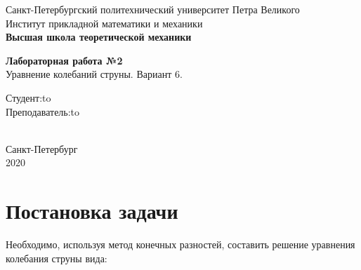 \documentclass[a4paper,fontsize=14pt]{article}
\begin{document}
	
	\begin{titlepage}
		\newpage
		
		\begin{center}
			Санкт-Петербургский политехнический университет Петра Великого \\
			Институт прикладной математики и механики \\
			\textbf{Высшая школа теоретической механики}
		\end{center}
		
		\vspace{10em}
		
		\begin{center}
			\Large{\textbf{Лабораторная работа №2}} \\
			Уравнение колебаний струны. Вариант 6. \\
		\end{center}
		
		\vspace{20em}
		
		
		
		\newbox{\lbox}
		\newlength{\maxl}
		\setlength{\maxl}{\wd\lbox}
		\hfill\parbox{12cm}{
			\hspace*{5cm}\hspace*{-5cm}Студент:\hfill\hbox to\\
			\hspace*{5cm}\hspace*{-5cm}Преподаватель:\hfill\hbox to\\
			\\
		}
		
		
		\vspace{\fill}
		
		\begin{center}
			Санкт-Петербург \\2020
		\end{center}
		
	\end{titlepage}
	
	\tableofcontents
	
	\newpage
	
	\section{Постановка задачи}
	
	Необходимо, используя метод конечных разностей, составить решение уравнения колебания струны вида: \\
	
\end{document}
